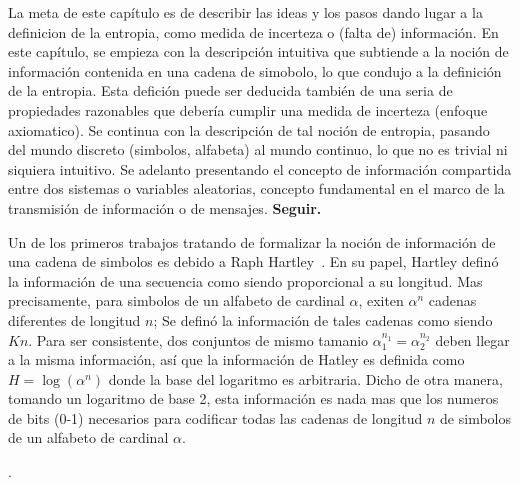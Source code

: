 {\color{red} La  meta de este cap\'itulo es  de describir las ideas  y los pasos
  dando lugar a la definicion de  la entropia, como medida de incerteza o (falta
  de)  informaci\'on.   En este  cap\'itulo,  se  empieza  con la  descripci\'on
  intuitiva que subtiende a la noci\'on de informaci\'on contenida en una cadena
  de simobolo, lo que condujo a  la definici\'on de la entropia. Esta defici\'on
  puede  ser deducida  tambi\'en  de  una seria  de  propiedades razonables  que
  deber\'ia cumplir  una medida de incerteza (enfoque  axiomatico).  Se continua
  con la descripci\'on  de tal noci\'on de entropia,  pasando del mundo discreto
  (simbolos,  alfabeta) al  mundo continuo,  lo que  no es  trivial  ni siquiera
  intuitivo.  Se  adelanto presentando  el concepto de  informaci\'on compartida
  entre dos sistemas o variables aleatorias, concepto fundamental en el marco de
  la transmisi\'on de informaci\'on o de mensajes. \bf Seguir. }


\label{s:SZ:Entropia}


\label{sec:SZ:DefinicionShannon}

Un de los primeros trabajos  tratando de formalizar la noci\'on de informaci\'on
de una cadena  de simbolos es debido a Raph  Hartley~\cite{Har28}.  En su papel,
Hartley defin\'o la informaci\'on de una secuencia como siendo proporcional a su
longitud. Mas precisamente,  para simbolos de un alfabeto  de cardinal $\alpha$,
exiten  $\alpha^n$   cadenas  diferentes  de   longitud  $n$;  Se   defin\'o  la
informaci\'on de  tales cadenas  como siendo $K  n$.  Para ser  consistente, dos
conjuntos de mismo  tamanio $\alpha_1^{n_1} = \alpha_2^{n_2}$ deben  llegar a la
misma informaci\'on, as\'i que la informaci\'on  de Hatley es definida como $H =
\log\left( \alpha^n \right)$  donde la base del logaritmo  es arbitraria.  Dicho
de otra manera,  tomando un logaritmo de base 2, esta  informaci\'on es nada mas
que los  numeros de bits  (0-1) necesarios para  codificar todas las  cadenas de
longitud $n$ de simbolos de un alfabeto de cardinal $\alpha$.

.

